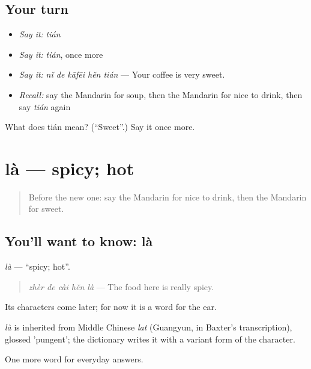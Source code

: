 \subsection*{Your turn}
\begin{itemize}
\raggedright
  \item \emph{Say it:} \emph{tián}
  \item \emph{Say it:} \emph{tián}, once more
  \item \emph{Say it:} \emph{nǐ de kāfēi hěn tián} — Your coffee is very sweet.
  \item \emph{Recall:} say the Mandarin for soup, then the Mandarin for nice to drink, then say \emph{tián} again
\end{itemize}

\begin{tcolorbox}[breakable,colback=teal!4,colframe=teal!35!black,title={Before you move on}]
What does tián mean? (\textquotedblleft{}Sweet\textquotedblright{}.) Say it once more.
\end{tcolorbox}
\section[là]{là — spicy; hot}

\label{lesson:ZH-C71-la}



\begin{quote}
Before the new one: say the Mandarin for nice to drink, then the Mandarin for sweet.
\end{quote}

\subsection*{You'll want to know: là}
\emph{là} — \textquotedblleft{}spicy; hot\textquotedblright{}.

\begin{quote}
\emph{zhèr de cài hěn là} — The food here is really spicy.
\end{quote}

Its characters come later; for now it is a word for the ear.

\begin{cousinweb}
\emph{là} is inherited from Middle Chinese \emph{lat} (Guangyun, in Baxter's transcription), glossed 'pungent'; the dictionary writes it with a variant form of the character.
\end{cousinweb}

\begin{grammarlens}[title={What you've built}]
One more word for everyday answers.
\end{grammarlens}

